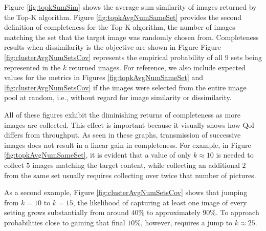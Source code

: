 Figure \ref{fig:topkSumSim} shows the average sum similarity of images returned by the Top-K algorithm.  Figure \ref{fig:topkAvgNumSameSet} provides the second definition of completeness for the Top-K algorithm, the number of images matching the set that the target image was randomly chosen from.  
Completeness results when dissimilarity is the objective are shown in Figure
Figure \ref{fig:clusterAvgNumSetsCov} represents the empirical probability of all $9$ sets being represented in the $k$ returned images.   For reference, we also include expected values for the metrics in Figures \ref{fig:topkAvgNumSameSet} and \ref{fig:clusterAvgNumSetsCov} if the images were selected from the entire image pool at random, i.e., without regard for image similarity or dissimilarity.  

All of these figures exhibit the diminishing returns of completeness as more images are collected.  This effect is important because it visually shows how QoI differs from throughput.  As seen in these graphs, transmission of successive images does not result in a linear gain in completeness.  For example, in Figure \ref{fig:topkAvgNumSameSet}, it is evident that a value of only $k \approx 10$ is needed to collect $5$ images matching the target content, while collecting an additional $2$ from the same set usually requires collecting over twice that number of pictures.  

As a second example, Figure \ref{fig:clusterAvgNumSetsCov} shows that jumping from $k=10$ to $k=15$, the likelihood of capturing at least one image of every setting grows substantially from around $40\%$ to approximately $90\%$.  To approach probabilities close to gaining that final $10\%$, however, requires a jump to $k\approx25$.%


